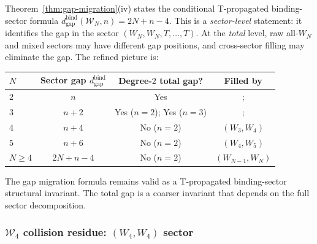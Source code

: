\begin{remark}%
\label{rem:gap-migration-refined}%
%
Theorem~\ref{thm:gap-migration}(iv) states the conditional
T-propagated binding-sector formula
$d_{\mathrm{gap}}^{\mathrm{bind}}(\mathcal{W}_N, n) = 2N + n - 4$.
This is a \emph{sector-level} statement: it identifies
the gap in the sector \((W_N,W_N,T,\ldots,T)\). At the
\emph{total} level, raw all-\(W_N\) and mixed sectors may have
different gap positions, and cross-sector filling may eliminate
the gap. The refined picture is:
\begin{center}
\small
\renewcommand{\arraystretch}{1.3}
\begin{tabular}{lccc}
\toprule
$N$ & \textbf{Sector gap} $d_{\mathrm{gap}}^{\mathrm{bind}}$
 & \textbf{Degree-$2$ total gap?}
 & \textbf{Filled by} \\
\midrule
$2$ & $n$ & Yes &; \\
$3$ & $n + 2$ & Yes ($n = 2$);
 Yes ($n = 3$) &; \\
$4$ & $n + 4$ & No ($n = 2$) & $(W_3, W_4)$ \\
$5$ & $n + 6$ & No ($n = 2$) & $(W_4, W_5)$ \\
$N \ge 4$ & $2N + n - 4$ & No ($n = 2$) & $(W_{N-1}, W_N)$ \\
\bottomrule
\end{tabular}
\end{center}
The gap migration formula remains valid as a T-propagated
binding-sector structural invariant. The total gap
is a coarser invariant that depends on the full
sector decomposition.
\end{remark}

\subsubsection{$\mathcal{W}_4$ collision residue:
$(W_4, W_4)$ sector}

